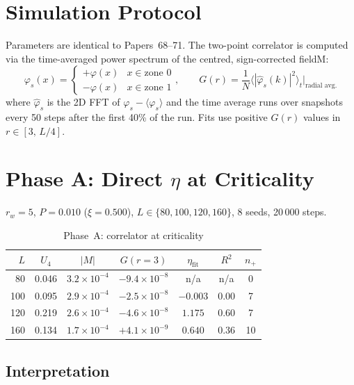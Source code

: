 \documentclass[11pt,a4paper]{article}
\begin{document}
\section{Simulation Protocol}

Parameters are identical to Papers~68--71.  The two-point correlator is computed
via the time-averaged power spectrum of the centred, sign-corrected fieldM:
\[
  \varphi_s(x) = \begin{cases}+\varphi(x) & x\in\text{zone }0 \\
                               -\varphi(x) & x\in\text{zone }1\end{cases},
  \qquad
  G(r) = \frac{1}{N}\bigl\langle|\hat\varphi_s(k)|^2\bigr\rangle_t
         \Big|_{\text{radial avg.}}
\]
where $\hat\varphi_s$ is the 2D FFT of $\varphi_s-\langle\varphi_s\rangle$
and the time average runs over snapshots every 50 steps after the first
40\% of the run.  Fits use positive $G(r)$ values in $r\in[3,\,L/4]$.

\section{Phase A: Direct $\eta$ at Criticality}\label{sec:A}

$r_w{=}5$, $P{=}0.010$ ($\xi{=}0.500$), $L\in\{80,100,120,160\}$,
8 seeds, 20\,000 steps.

\begin{table}[h]
\centering
\caption{Phase~A: correlator at criticality}
\label{tab:phaseA}
\begin{tabular}{rcccccc}
\toprule
$L$ & $U_4$ & $|M|$ & $G(r{=}3)$ & $\eta_\text{fit}$ & $R^2$ & $n_+$ \\
\midrule
 80 & 0.046 & $3.2\times10^{-4}$ & $-9.4\times10^{-8}$ & n/a  & n/a   & 0  \\
100 & 0.095 & $2.9\times10^{-4}$ & $-2.5\times10^{-8}$ & $-0.003$ & 0.00 & 7 \\
120 & 0.219 & $2.6\times10^{-4}$ & $-4.6\times10^{-8}$ & $1.175$ & 0.60 & 7 \\
160 & 0.134 & $1.7\times10^{-4}$ & $+4.1\times10^{-9}$ & $0.640$ & 0.36 & 10 \\
\bottomrule
\end{tabular}
\end{table}

\subsection{Interpretation}
\end{document}
